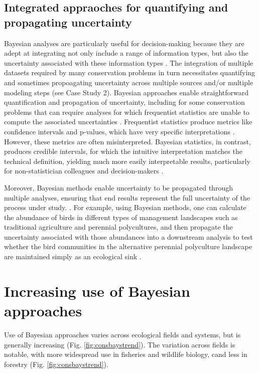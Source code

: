 \documentclass{article}
\begin{document}
\subsection*{Integrated appraoches for quantifying and propagating uncertainty} 
\par Bayesian analyses are particularly useful for decision-making because they are adept at integrating not only include a range of information types, but also the uncertainty associated with these information types \citep[e.g.,][]{stern2022interweaving}. The integration of multiple datasets required by many conservation problems in turn necessitates quantifying and sometimes propoagating uncertainty across multiple sources and/or multiple modeling steps (see Case Study 2). Bayesian approaches enable straightforward quantification and  propagation of  uncertainty, including for some conservation problems that can require analyses for which frequentist statistics are unable to compute the associated uncertainties \citep{bolker2009a,bates2006r}. Frequentist statistics produce metrics like confidence intervals and p-values, which have very specific interpretations \citep{fornacon2021bayesian}. However, these metrics are often misinterpreted. Bayesian statistics, in contrast, produces credible intervals, for which the intuitive interpretation matches the technical definition, yielding much more easily interpretable results, particularly for non-statistician colleagues and decision-makers \citep{fornacon2021bayesian}. 
\par Moreover, Bayesian methods enable uncertainty to be propagated through multiple analyses, ensuring that end results represent the full uncertainty of the process under study. \citep{draper1995assessment,gilbert2023propagating,Eyster2022,Saunders2019}. For example, using Bayesian methods, one can calculate the abundance of birds in different types of management landscapes such as traditional agriculture and perennial polycultures, and then propagate the uncertainty associated with those abundances into a downstream analysis to test whether the bird communities in the alternative perennial polyculture landscape are maintained simply as an ecological sink \citep{Eyster2022}. 

\section* {Increasing use of Bayesian approaches}
\par Use of Bayesian approaches varies across ecological fields and systems, but is generally increasing (Fig. \ref{fig:consbaystrend}). The variation across fields is notable, with more widespread use in fisheries and wildlife biology, cand less in forestry  (Fig. \ref{fig:consbaystrend}).
\end{document}
